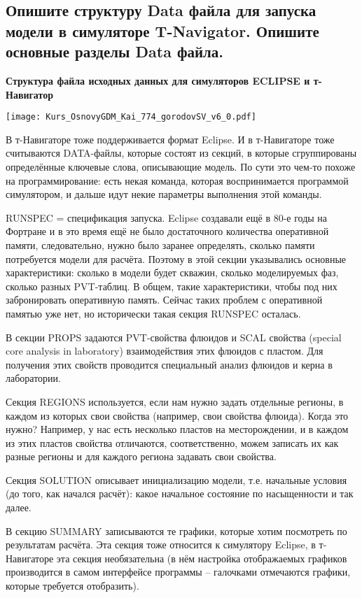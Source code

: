 

\subsection{Опишите структуру Data файла для запуска модели в симуляторе T-Navigator. Опишите основные разделы Data файла.}

\textbf{Структура файла исходных данных для симуляторов ECLIPSE и т-Навигатор}

\texttt{[image: Kurs\_OsnovyGDM\_Kai\_774\_gorodovSV\_v6\_0.pdf]}

В т-Навигаторе тоже поддерживается формат Eclipse.
И в т-Навигаторе тоже считываются DATA-файлы, которые состоят из секций, в которые сгруппированы определённые ключевые слова, описывающие модель.
По сути это чем-то похоже на программирование: есть некая команда, которая воспринимается программой симулятором, и дальше идут некие параметры выполнения этой команды.

RUNSPEC = спецификация запуска. Eclipse создавали ещё в 80-е годы на Фортране и в это время ещё не было достаточного количества оперативной памяти, следовательно, нужно было заранее определять, сколько памяти потребуется модели для расчёта.
Поэтому в этой секции указывались основные характеристики: сколько в модели будет скважин, сколько моделируемых фаз, сколько разных PVT-таблиц. В общем, такие характеристики, чтобы под них забронировать оперативную память.
Сейчас таких проблем с оперативной памятью уже нет, но исторически такая секция RUNSPEC осталась.

В секции PROPS задаются PVT-свойства флюидов и SCAL свойства (special core analysis in laboratory) взаимодействия этих флюидов с пластом.
Для получения этих свойств проводится специальный анализ флюидов и керна в лаборатории.

Секция REGIONS используется, если нам нужно задать отдельные регионы, в каждом из которых свои свойства (например, свои свойства флюида).
Когда это нужно? Например, у нас есть несколько пластов на месторождении, и в каждом из этих пластов свойства отличаются, соответственно, можем записать их как разные регионы и для каждого региона задавать свои свойства.

Секция SOLUTION описывает инициализацию модели, т.е. начальные условия (до того, как начался расчёт): какое начальное состояние по насыщенности и так далее.

В секцию SUMMARY записываются те графики, которые хотим посмотреть по результатам расчёта.
Эта секция тоже относится к симулятору Eclipse, в т-Навигаторе эта секция необязательна (в нём настройка отображаемых графиков производится в самом интерфейсе программы -- галочками отмечаются графики, которые требуется отобразить).
\\

